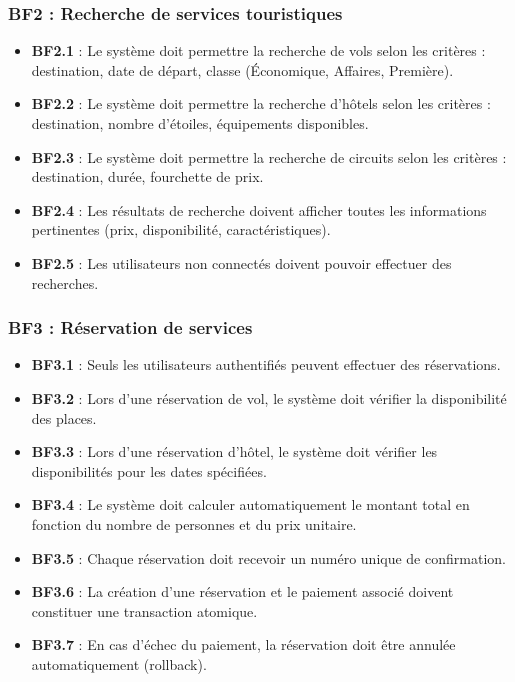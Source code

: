 \documentclass[12pt,a4paper]{report}
\begin{document}
\subsubsection{BF2 : Recherche de services touristiques}

\begin{itemize}
    \item \textbf{BF2.1} : Le système doit permettre la recherche de vols selon les critères : destination, date de départ, classe (Économique, Affaires, Première).
    \item \textbf{BF2.2} : Le système doit permettre la recherche d'hôtels selon les critères : destination, nombre d'étoiles, équipements disponibles.
    \item \textbf{BF2.3} : Le système doit permettre la recherche de circuits selon les critères : destination, durée, fourchette de prix.
    \item \textbf{BF2.4} : Les résultats de recherche doivent afficher toutes les informations pertinentes (prix, disponibilité, caractéristiques).
    \item \textbf{BF2.5} : Les utilisateurs non connectés doivent pouvoir effectuer des recherches.
\end{itemize}

\subsubsection{BF3 : Réservation de services}

\begin{itemize}
    \item \textbf{BF3.1} : Seuls les utilisateurs authentifiés peuvent effectuer des réservations.
    \item \textbf{BF3.2} : Lors d'une réservation de vol, le système doit vérifier la disponibilité des places.
    \item \textbf{BF3.3} : Lors d'une réservation d'hôtel, le système doit vérifier les disponibilités pour les dates spécifiées.
    \item \textbf{BF3.4} : Le système doit calculer automatiquement le montant total en fonction du nombre de personnes et du prix unitaire.
    \item \textbf{BF3.5} : Chaque réservation doit recevoir un numéro unique de confirmation.
    \item \textbf{BF3.6} : La création d'une réservation et le paiement associé doivent constituer une transaction atomique.
    \item \textbf{BF3.7} : En cas d'échec du paiement, la réservation doit être annulée automatiquement (rollback).
\end{itemize}
\end{document}
